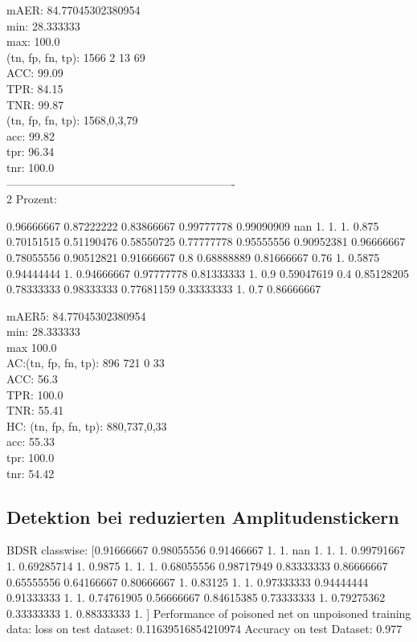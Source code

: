 \documentclass[11pt,a4paper]{article}
\numberwithin{equation}{section}
\begin{document}
	mAER:  84.77045302380954\\
	min:  28.333333\\
	max:  100.0\\
	
	(tn, fp, fn, tp):  1566 2 13 69\\
	ACC: 99.09\\
	TPR:  84.15\\
	TNR:  99.87\\
	
	
	(tn, fp, fn, tp): 1568,0,3,79\\
	acc: 99.82\\
	tpr: 96.34\\
	tnr: 100.0\\
	-------------------------------------------------------------\\
	
	2 Prozent:
	
	0.96666667 0.87222222 0.83866667 0.99777778 0.99090909        nan
	1.         1.         1.         0.875      0.70151515 0.51190476
	0.58550725 0.77777778 0.95555556 0.90952381 0.96666667 0.78055556
	0.90512821 0.91666667 0.8        0.68888889 0.81666667 0.76
	1.         0.5875     0.94444444 1.         0.94666667 0.97777778
	0.81333333 1.         0.9        0.59047619 0.4        0.85128205
	0.78333333 0.98333333 0.77681159 0.33333333 1.         0.7
	0.86666667
	
	mAER5:  84.77045302380954\\
	min:  28.333333\\
	max  100.0\\
	
	AC:(tn, fp, fn, tp):  896 721 0 33\\
	ACC: 56.3\\
	TPR:  100.0\\
	TNR:  55.41\\
	
	HC: (tn, fp, fn, tp): 880,737,0,33\\
	acc: 55.33\\
	tpr: 100.0\\
	tnr: 54.42\\
	
	
	\subsection{Detektion bei reduzierten Amplitudenstickern}
	
	BDSR classwise:
	[0.91666667 0.98055556 0.91466667 1.         1.                nan
	1.         1.         1.         0.99791667 1.         0.69285714
	1.         0.9875     1.         1.         1.         0.68055556
	0.98717949 0.83333333 0.86666667 0.65555556 0.64166667 0.80666667
	1.         0.83125    1.         1.         0.97333333 0.94444444
	0.91333333 1.         1.         0.74761905 0.56666667 0.84615385
	0.73333333 1.         0.79275362 0.33333333 1.         0.88333333
	1.        ]
	Performance of poisoned net on unpoisoned training data:
	loss on test dataset: 0.11639516854210974
	Accuracy on test Dataset: 0.977 
	
\end{document}
